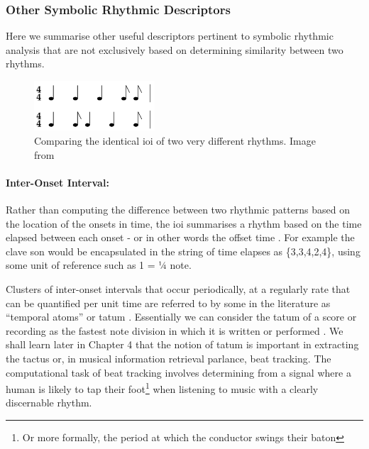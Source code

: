 \subsubsection{Other Symbolic Rhythmic Descriptors}

Here we summarise other useful descriptors pertinent to symbolic rhythmic analysis that are not exclusively based on determining similarity between two rhythms.

\begin{figure}
	\begin{center}
		\includegraphics[width=0.4\textwidth]{ch03_symbolic/figures/ioi_comparison.png}
	\end{center}
	\caption[Comparing the identical IOI of two very different rhythms.]{Comparing the identical \acrshort{ioi} of two very different rhythms. Image from \cite{Dixon2004} }
	\label{fig:ioi_comparison}
\end{figure}


\paragraph{Inter-Onset Interval:} 
Rather than computing the difference between two rhythmic patterns based on the location of the onsets in time, the \acrfull{ioi} summarises a rhythm based on the time elapsed between each onset - or in other words the offset time \citep{Toussaint2013}. For example the clave son would be encapsulated in the string of time elapses as \{3,3,4,2,4\}, using some unit of reference such as 1 = ¼ note. 

Clusters of inter-onset intervals that occur periodically, at a regularly rate that can be quantified per unit time are referred to by some in the literature as “temporal atoms” or tatum 
\citep{Bilmes1993, Sethares2007, Jehan2005}. Essentially we can consider the tatum of a score or recording as the fastest note division in which it is written or performed \citep{Sethares2007}. We shall learn later in Chapter 4 that the notion of tatum is important in extracting the tactus or, in musical information retrieval parlance, beat tracking. The computational task of beat tracking involves determining from a signal where a human is likely to tap their foot\footnote{Or more formally, the period at which the conductor swings their baton} when listening to music with a clearly discernable rhythm. 

